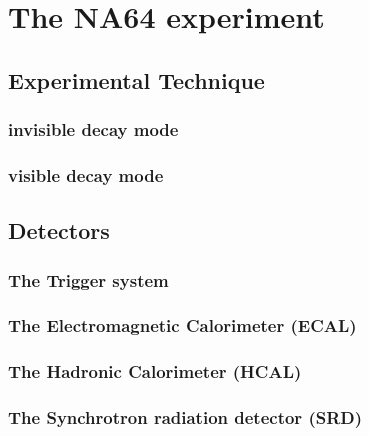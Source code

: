 
\chapter{The NA64 experiment} %

\label{chapter2} %


\section{Experimental Technique}
\label{chapter1:sec:experimental-technique}

\subsection{invisible decay mode}
\label{chapter1:sec:experimental-technique-invis}

\subsection{visible decay mode}
\label{chapter1:sec:experimental-technique-vis}

\section{Detectors}
\label{chapter1:sec:detectors}

\subsection{The Trigger system}
\label{chapter1:sec:detectors-trigger}

\subsection{The Electromagnetic Calorimeter (ECAL)}
\label{chapter1:sec:detectors-ecal}

\subsection{The Hadronic Calorimeter (HCAL)}
\label{chapter1:sec:detectors-hcal}

\subsection{The Synchrotron radiation detector (SRD)}
\label{chapter1:sec:detectors-srd}

